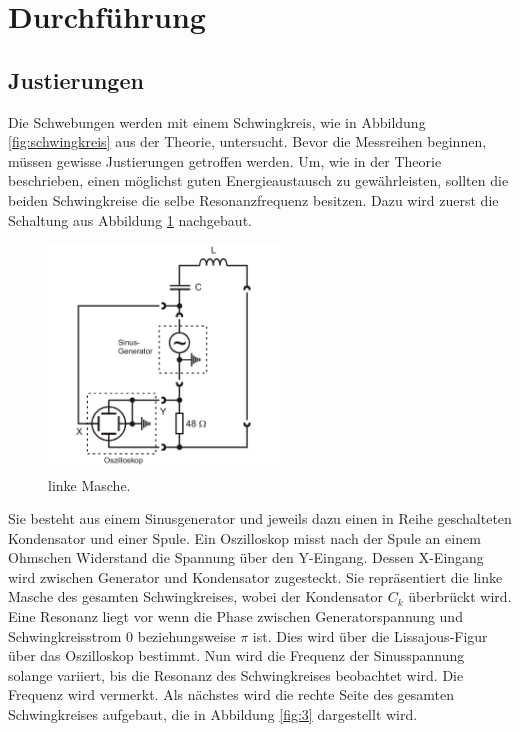 \section{Durchführung}
\label{sec:Durchführung}








\subsection{Justierungen}
\label{sec:d0}
Die Schwebungen werden mit einem Schwingkreis, wie in Abbildung \ref{fig:schwingkreis} aus der Theorie, untersucht.
Bevor die Messreihen beginnen, müssen gewisse Justierungen getroffen werden.
Um, wie in der Theorie beschrieben, einen möglichst guten Energieaustausch zu gewährleisten, sollten die beiden Schwingkreise die selbe Resonanzfrequenz besitzen.
Dazu wird zuerst die Schaltung aus Abbildung \ref{fig:2} nachgebaut.

\begin{figure}[H]
  \centering
  \includegraphics[height=6cm]{just1.png}
  \caption{linke Masche. \cite{sample}}
  \label{fig:2}
\end{figure}

Sie besteht aus einem Sinusgenerator und jeweils dazu einen in Reihe geschalteten Kondensator und einer Spule.
Ein Oszilloskop misst nach der Spule an einem Ohmschen Widerstand die Spannung über den Y-Eingang.
Dessen X-Eingang wird zwischen Generator und Kondensator zugesteckt.
Sie repräsentiert die linke Masche des gesamten Schwingkreises, wobei der Kondensator $C_k$ überbrückt wird.\\
Eine Resonanz liegt vor wenn die Phase zwischen Generatorspannung und Schwingkreisstrom 0 beziehungsweise $\pi$ ist.
Dies wird über die Lissajous-Figur über das Oszilloskop bestimmt.
Nun wird die Frequenz der Sinusspannung solange variiert, bis die Resonanz des Schwingkreises beobachtet wird.
Die Frequenz wird vermerkt.
Als nächstes wird die rechte Seite des gesamten Schwingkreises aufgebaut, die in Abbildung \ref{fig:3} dargestellt wird.

